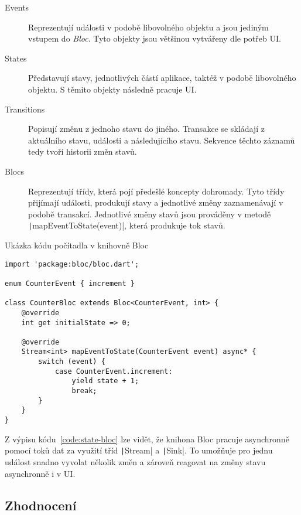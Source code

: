 \begin{description}
    \item[Events] Reprezentují události v podobě libovolného objektu
    a jsou jediným vstupem do \emph{Bloc}.
    Tyto objekty jsou většinou vytvářeny dle potřeb UI.
    \item[States] Představují stavy,
    jednotlivých částí aplikace,
    taktéž v podobě libovolného objektu.
    S těmito objekty následně pracuje UI.
    \item[Transitions] Popisují změnu z jednoho stavu do jiného.
    Transakce se skládají z aktuálního stavu, události a následujícího stavu.
    Sekvence těchto záznamů tedy tvoří historii změn stavů.
    \item[Blocs] Reprezentují třídy,
    která pojí předešlé koncepty dohromady.
    Tyto třídy přijímají události, produkují stavy a jednotlivé změny
    zaznamenávají v podobě transakcí.
    Jednotlivé změny stavů jsou prováděny v metodě
    \texttt|mapEventToState(event)|,
    která produkuje tok stavů.
\end{description}

\begin{listing}
    \caption{Ukázka kódu počítadla v knihovně
    Bloc~\cite{bloclibrary_coreconcepts}}
    \label{code:state-bloc}
    \begin{verbatim}
import 'package:bloc/bloc.dart';

enum CounterEvent { increment }

class CounterBloc extends Bloc<CounterEvent, int> {
    @override
    int get initialState => 0;

    @override
    Stream<int> mapEventToState(CounterEvent event) async* {
        switch (event) {
            case CounterEvent.increment:
                yield state + 1;
                break;
        }
    }
}
    \end{verbatim}
\end{listing}

Z výpisu kódu~\ref{code:state-bloc} lze vidět,
že knihona Bloc pracuje asynchronně pomocí toků dat za využití
tříd \texttt|Stream| a \texttt|Sink|.
To umožňuje pro jednu událost snadno vyvolat několik změn
a zároveň reagovat na změny stavu asynchronně i v UI.

\subsection{Zhodnocení}

